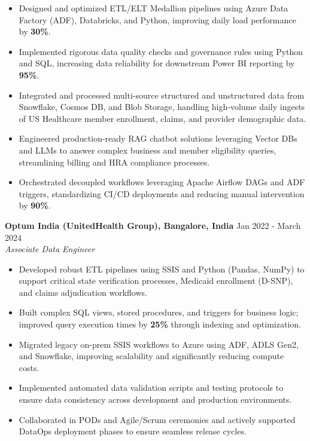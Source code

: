\documentclass[a4paper,8pt]{article}
\begin{document}
\begin{itemize}[leftmargin=1.2em, itemsep=1pt, topsep=0pt, parsep=0pt, partopsep=0pt]
    \item Designed and optimized ETL/ELT Medallion pipelines using Azure Data Factory (ADF), Databricks, and Python, improving daily load performance by \textbf{30\%}.
    \item Implemented rigorous data quality checks and governance rules using Python and SQL, increasing data reliability for downstream Power BI reporting by \textbf{95\%}.
    \item Integrated and processed multi-source structured and unstructured data from Snowflake, Cosmos DB, and Blob Storage, handling high-volume daily ingests of US Healthcare member enrollment, claims, and provider demographic data.
    \item Engineered production-ready RAG chatbot solutions leveraging Vector DBs and LLMs to answer complex business and member eligibility queries, streamlining billing and HRA compliance processes.
    \item Orchestrated decoupled workflows leveraging Apache Airflow DAGs and ADF triggers, standardizing CI/CD deployments and reducing manual intervention by \textbf{90\%}.
\end{itemize}
\vspace{-0.5em}

\noindent
\textbf{Optum India (UnitedHealth Group), Bangalore, India} \hfill \textcolor[HTML]{371e77}{Jan 2022 - March 2024} \\
\textit{\textcolor[HTML]{371e77}{Associate Data Engineer}}\\[-1.7em]

\begin{itemize}[leftmargin=1.2em, itemsep=1pt, topsep=0pt, parsep=0pt, partopsep=0pt]
    \item Developed robust ETL pipelines using SSIS and Python (Pandas, NumPy) to support critical state verification processes, Medicaid enrollment (D-SNP), and claims adjudication workflows.
    \item Built complex SQL views, stored procedures, and triggers for business logic; improved query execution times by \textbf{25\%} through indexing and optimization.
    \item Migrated legacy on-prem SSIS workflows to Azure using ADF, ADLS Gen2, and Snowflake, improving scalability and significantly reducing compute costs.
    \item Implemented automated data validation scripts and testing protocols to ensure data consistency across development and production environments.
    \item Collaborated in PODs and Agile/Scrum ceremonies and actively supported DataOps deployment phases to ensure seamless release cycles.
\end{itemize}
\vspace{0em}
\end{document}
